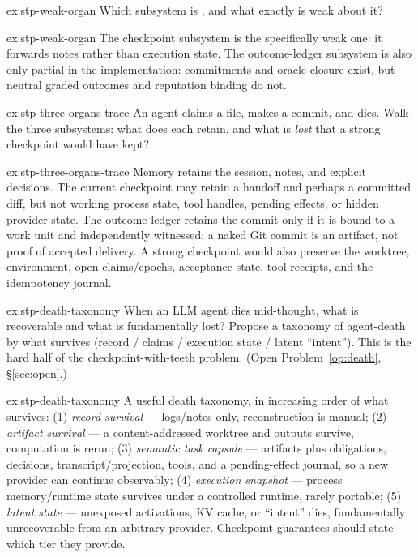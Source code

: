 \documentclass[11pt,a4paper]{article}
\theoremstyle{definition}
\begin{document}
\begin{pdexercise}[kind=Check,rating=1]{ex:stp-weak-organ}
Which subsystem is \BUILTWEAK, and what exactly is weak about it?
\end{pdexercise}
\begin{pdsolution}{ex:stp-weak-organ}
The checkpoint subsystem is the specifically weak one: it forwards notes rather
than execution state. The outcome-ledger subsystem is also only partial in the
implementation: commitments and oracle closure exist, but neutral graded
outcomes and reputation binding do not.
\end{pdsolution}
\begin{pdexercise}[kind=Trace,rating=2]{ex:stp-three-organs-trace}
An agent claims a file, makes a commit, and dies. Walk the three subsystems: what
does each retain, and what is \emph{lost} that a strong checkpoint would have
kept?
\end{pdexercise}
\begin{pdsolution}{ex:stp-three-organs-trace}
Memory retains the session, notes, and explicit decisions. The current
checkpoint may retain a handoff and perhaps a committed diff, but not working
process state, tool handles, pending effects, or hidden provider state. The
outcome ledger retains the commit only if it is bound to a work unit and
independently witnessed; a naked Git commit is an artifact, not proof of
accepted delivery. A strong checkpoint would also preserve the worktree,
environment, open claims/epochs, acceptance state, tool receipts, and the
idempotency journal.
\end{pdsolution}
\begin{pdexercise}[kind=Open,rating=3]{ex:stp-death-taxonomy}
When an LLM agent dies mid-thought, what is recoverable and what is
fundamentally lost? Propose a taxonomy of agent-death by what survives
(record / claims / execution state / latent ``intent''). This is the hard
half of the checkpoint-with-teeth problem. (Open Problem~\ref{op:death},
\S\ref{sec:open}.)
\end{pdexercise}
\begin{pdsolution}{ex:stp-death-taxonomy}
A useful death taxonomy, in increasing order of what survives: (1)
\emph{record survival} --- logs/notes only, reconstruction is manual; (2)
\emph{artifact survival} --- a content-addressed worktree and outputs survive,
computation is rerun; (3) \emph{semantic task capsule} --- artifacts plus
obligations, decisions, transcript/projection, tools, and a pending-effect
journal, so a new provider can continue observably; (4) \emph{execution
snapshot} --- process memory/runtime state survives under a controlled
runtime, rarely portable; (5) \emph{latent state} --- unexposed activations,
KV cache, or ``intent'' dies, fundamentally unrecoverable from an arbitrary
provider. Checkpoint guarantees should state which tier they provide.
\end{pdsolution}
\end{document}
